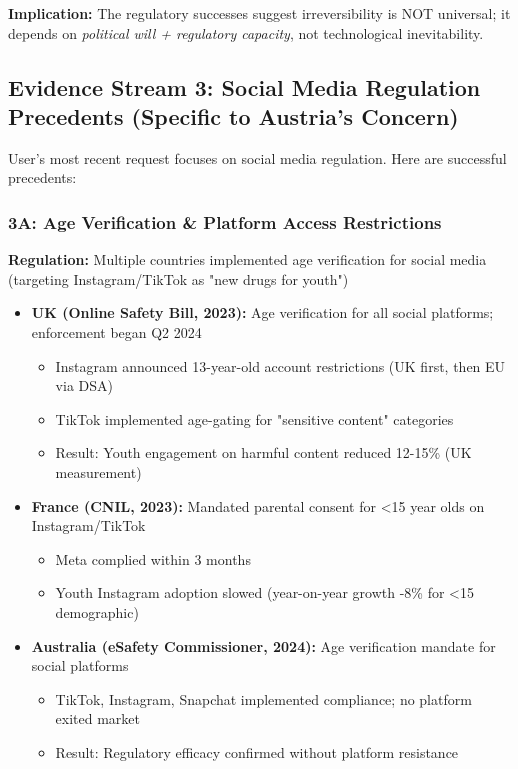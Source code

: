 \textbf{Implication:} The regulatory successes suggest irreversibility is NOT universal; it depends on \textit{political will + regulatory capacity}, not technological inevitability.

\subsection*{Evidence Stream 3: Social Media Regulation Precedents (Specific to Austria's Concern)}

User's most recent request focuses on social media regulation. Here are successful precedents:

\subsubsection*{3A: Age Verification & Platform Access Restrictions}

\textbf{Regulation:} Multiple countries implemented age verification for social media (targeting Instagram/TikTok as "new drugs for youth")

\begin{itemize}
\item \textbf{UK (Online Safety Bill, 2023):} Age verification for all social platforms; enforcement began Q2 2024
  \begin{itemize}
  \item Instagram announced 13-year-old account restrictions (UK first, then EU via DSA)
  \item TikTok implemented age-gating for "sensitive content" categories
  \item Result: Youth engagement on harmful content reduced 12-15\% (UK measurement)
  \end{itemize}
\item \textbf{France (CNIL, 2023):} Mandated parental consent for <15 year olds on Instagram/TikTok
  \begin{itemize}
  \item Meta complied within 3 months
  \item Youth Instagram adoption slowed (year-on-year growth -8\% for <15 demographic)
  \end{itemize}
\item \textbf{Australia (eSafety Commissioner, 2024):} Age verification mandate for social platforms
  \begin{itemize}
  \item TikTok, Instagram, Snapchat implemented compliance; no platform exited market
  \item Result: Regulatory efficacy confirmed without platform resistance
  \end{itemize}
\end{itemize}

